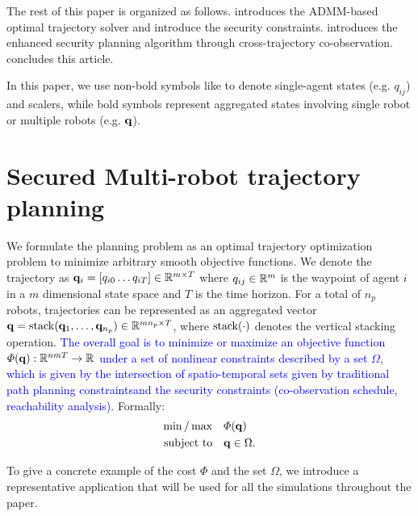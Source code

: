 \documentclass[10pt,twocolumn,twoside]{IEEEtran}
\newcommand{\new}[1]{\textcolor{blue}{#1}}
\newcommand{\news}{\color{blue}}
\begin{document}
The rest of this paper is organized as follows.  introduces the ADMM-based optimal trajectory solver and introduce the security constraints.  introduces the enhanced security planning algorithm through cross-trajectory co-observation.  concludes this article.

\noindent{} 
In this paper, we use non-bold symbols like to denote single-agent states (e.g. $q_{ij}$) and scalers, while bold symbols represent aggregated states involving single robot or multiple robots (e.g. $\mathbf{q}$). 

\section{Secured Multi-robot trajectory planning}\label{sec:ADMM-planning}
We formulate the planning problem as an optimal trajectory optimization problem to minimize arbitrary smooth objective functions. {\news We denote the trajectory as $\mathbf{q}_i = [q_{i0}\dots q_{iT}]\in\mathbb{R}^{m\times T}{}$ where $q_{ij}\in\mathbb{R}^{m}{}$ is the waypoint of agent $i$ in a $m$ dimensional state space and $T$ is the time horizon. For a total of $n_p$ robots, trajectories can be represented as an aggregated vector $\mathbf{q} = \operatorname{stack}(\mathbf{q}_1,\dots,\mathbf{q}_{n_p})\in \mathbb{R}^{m n_p\times T}{}$, where $\operatorname{stack}(\cdot)$ denotes the vertical stacking operation. }
\new{The overall goal is to minimize or maximize an objective function $\varPhi(\mathbf{q}):\mathbb{R}^{n m T}{} \to \mathbb{R}^{}{}$ under a set of nonlinear constraints described by a set $\Omega$, which is given by the intersection of spatio-temporal sets given by traditional path planning constraintsand the security constraints (co-observation schedule, reachability analysis).} Formally:
\begin{equation}\label{eq:general-problem}
	\begin{split}
		\min/\max & \quad \varPhi(\mathbf{q})\\
		\textrm{subject to} &\quad \mathbf{q} \in \Omega.
	\end{split}
\end{equation}

To give a concrete example of the cost $\varPhi$ and the set $\Omega$, we introduce a representative application that will be used for all the simulations throughout the paper.
\end{document}
